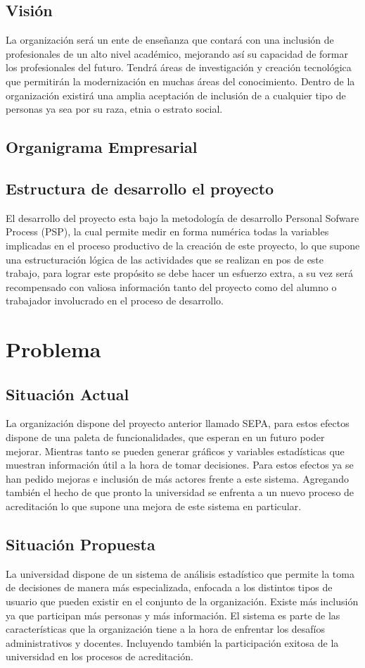 \documentclass[a4paper,12pt,openany,oneside]{book}
\begin{document}
\section{Visión}
La organización será un ente de enseñanza que contará con una inclusión de profesionales de un alto nivel académico, mejorando así su capacidad de formar los profesionales del futuro. Tendrá áreas de investigación y creación tecnológica que permitirán la modernización en muchas áreas del conocimiento. Dentro de la organización existirá una amplia aceptación de inclusión de a cualquier tipo de personas ya sea por su raza, etnia o estrato social. 
\section{Organigrama Empresarial}

\section{Estructura de desarrollo el proyecto}
El desarrollo del proyecto esta bajo la metodología de desarrollo Personal Sofware Process (PSP), la cual permite medir en forma numérica todas la variables implicadas en el proceso productivo de la creación de este proyecto, lo que supone una estructuración lógica de las actividades que se realizan en pos de este trabajo, para lograr este propósito se debe hacer un esfuerzo extra, a su vez será recompensado con valiosa información tanto del proyecto como del alumno o trabajador involucrado en el proceso de desarrollo.
\chapter{Problema}
\thispagestyle{empty}
\section{Situación Actual}
La organización dispone del proyecto anterior llamado SEPA, para estos efectos dispone de una paleta de funcionalidades, que esperan en un futuro poder mejorar. Mientras tanto se pueden generar gráficos y variables estadísticas que muestran información útil a la hora de tomar decisiones. Para estos efectos ya se han pedido mejoras e inclusión de más actores frente a este sistema. Agregando también el hecho de que pronto la universidad se enfrenta a un nuevo proceso de acreditación lo que supone una mejora de este sistema en particular.
\section{Situación Propuesta}
La universidad dispone de un sistema de análisis estadístico que permite la toma de decisiones de manera más especializada, enfocada a los distintos tipos de usuario que pueden existir en el conjunto de la organización. Existe más inclusión ya que participan más personas y más información. El sistema  es parte de las características que la organización tiene a la hora de enfrentar los desafíos administrativos y docentes. Incluyendo también la participación exitosa de la universidad en los procesos de acreditación.
\end{document}

